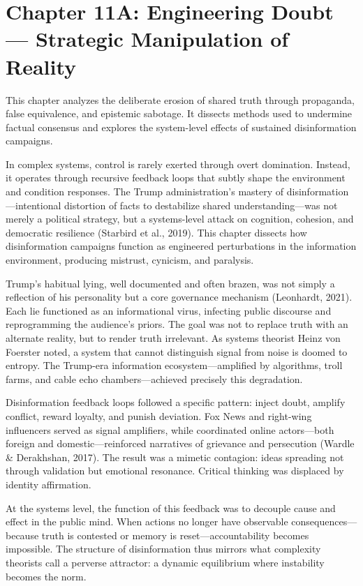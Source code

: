 \chapter*{Chapter 11A: Engineering Doubt — Strategic Manipulation of Reality}

\noindent This chapter analyzes the deliberate erosion of shared truth
through propaganda, false equivalence, and epistemic sabotage. It
dissects methods used to undermine factual consensus and explores the
system-level effects of sustained disinformation campaigns.

In complex systems, control is rarely exerted through overt domination.
Instead, it operates through recursive feedback loops that subtly shape
the environment and condition responses. The Trump administration's
mastery of disinformation---intentional distortion of facts to
destabilize shared understanding---was not merely a political strategy,
but a systems-level attack on cognition, cohesion, and democratic
resilience (Starbird et al., 2019). This chapter dissects how
disinformation campaigns function as engineered perturbations in the
information environment, producing mistrust, cynicism, and paralysis.

Trump's habitual lying, well documented and often brazen, was not simply
a reflection of his personality but a core governance mechanism
(Leonhardt, 2021). Each lie functioned as an informational virus,
infecting public discourse and reprogramming the audience's priors. The
goal was not to replace truth with an alternate reality, but to render
truth irrelevant. As systems theorist Heinz von Foerster noted, a system
that cannot distinguish signal from noise is doomed to entropy. The
Trump-era information ecosystem---amplified by algorithms, troll farms,
and cable echo chambers---achieved precisely this degradation.

Disinformation feedback loops followed a specific pattern: inject doubt,
amplify conflict, reward loyalty, and punish deviation. Fox News and
right-wing influencers served as signal amplifiers, while coordinated
online actors---both foreign and domestic---reinforced narratives of
grievance and persecution (Wardle \& Derakhshan, 2017). The result was a
mimetic contagion: ideas spreading not through validation but emotional
resonance. Critical thinking was displaced by identity affirmation.

At the systems level, the function of this feedback was to decouple
cause and effect in the public mind. When actions no longer have
observable consequences---because truth is contested or memory is
reset---accountability becomes impossible. The structure of
disinformation thus mirrors what complexity theorists call a perverse
attractor: a dynamic equilibrium where instability becomes the norm.

